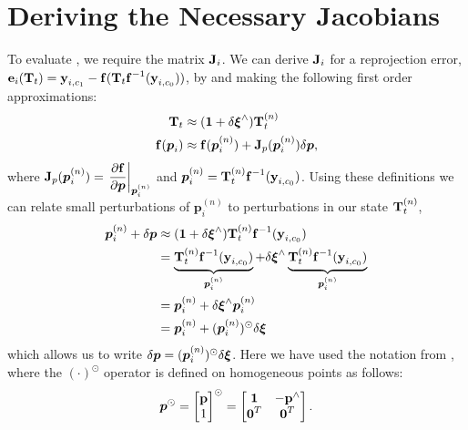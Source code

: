 \section{Deriving the Necessary Jacobians}
To evaluate , we require the matrix $\boldsymbol{\mathbf{J}}_{i}$. We can derive $\boldsymbol{\mathbf{J}}_{i}$ for a reprojection error, $\boldsymbol{\mathbf{e}}_{i}(\boldsymbol{\mathbf{T}}_t)  = \boldsymbol{\mathbf{y}}_{i, c_1} - \boldsymbol{\mathbf{f}}( \boldsymbol{\mathbf{T}}_t 
    \boldsymbol{\mathbf{f}}^{-1}( \boldsymbol{\mathbf{y}}_{i, c_0} ) )$, by and making the following first order approximations:
    \begin{align}
    	\boldsymbol{\mathbf{T}}_t &\approx (\boldsymbol{\mathbf{1}} + \delta\boldsymbol{\mathbf{\xi}}^{\wedge}) \boldsymbol{\mathbf{T}}_t^{(n)} \\
    	\boldsymbol{\mathbf{f}}(\boldsymbol{p}_i) & \approx \boldsymbol{\mathbf{f}}(\boldsymbol{p}_i^{(n)}) + \boldsymbol{\mathbf{J}}_p (\boldsymbol{p}_i^{(n)})  \delta \boldsymbol{p},
    \end{align}
where $\boldsymbol{\mathbf{J}}_p(\boldsymbol{p}_i^{(n)}) = \left.\dfrac{\partial \boldsymbol{\mathbf{f}}}{\partial \boldsymbol{p}}\right|_{\boldsymbol{p}_i^{(n)}}$ and $\boldsymbol{p}_i^{(n)} = \boldsymbol{\mathbf{T}}_t^{(n)} 
    \boldsymbol{\mathbf{f}}^{-1}(\boldsymbol{\mathbf{y}}_{i, c_0})$. Using these definitions we can relate small perturbations of $\boldsymbol{p}_i^{(n)}$ to perturbations in our state $\boldsymbol{\mathbf{T}}_t^{(n)}$,
\begin{align}
	\boldsymbol{p}_i^{(n)} + \delta \boldsymbol{p} &\approx (\boldsymbol{\mathbf{1}} + \delta\boldsymbol{\mathbf{\xi}}^{\wedge}) \boldsymbol{\mathbf{T}}_t^{(n)} 
    \boldsymbol{\mathbf{f}}^{-1}( \boldsymbol{\mathbf{y}}_{i, c_0} ) \\
    &= \underbrace{\boldsymbol{\mathbf{T}}_t^{(n)} 
    \boldsymbol{\mathbf{f}}^{-1}(\boldsymbol{\mathbf{y}}_{i, c_0})}_{\boldsymbol{p}_i^{(n)}} + \delta\boldsymbol{\mathbf{\xi}}^{\wedge}\underbrace{\boldsymbol{\mathbf{T}}_t^{(n)} 
    \boldsymbol{\mathbf{f}}^{-1}(\boldsymbol{\mathbf{y}}_{i, c_0})}_{\boldsymbol{p}_i^{(n)}} \\
    &= \boldsymbol{p}_i^{(n)} + \delta\boldsymbol{\mathbf{\xi}}^{\wedge} \boldsymbol{p}_i^{(n)} \\
    &= \boldsymbol{p}_i^{(n)} + (\boldsymbol{p}_i^{(n)})^\odot \delta\boldsymbol{\mathbf{\xi}}
\end{align}
which allows us to write $\delta \boldsymbol{p} = (\boldsymbol{p}_i^{(n)})^\odot \delta\boldsymbol{\mathbf{\xi}}$. Here we have used the notation from \cite{Barfoot2017-ri}, where the $(\cdot)^\odot$ operator is defined on homogeneous points as follows:
\begin{equation}
\boldsymbol{p}^\odot = \begin{bmatrix} \boldsymbol{\mathbf{p}} \\ 1 \end{bmatrix}^\odot = \begin{bmatrix} \boldsymbol{\mathbf{1}} & -\boldsymbol{\mathbf{p}}^\wedge \\ \boldsymbol{\mathbf{0}}^T & \boldsymbol{\mathbf{0}}^T\end{bmatrix}.
\end{equation}
